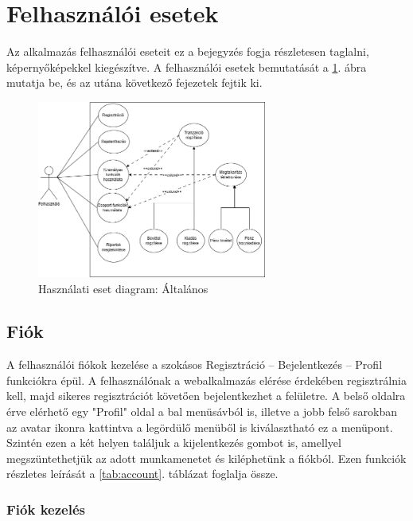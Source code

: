 \section{Felhasználói esetek}
Az alkalmazás felhasználói eseteit ez a bejegyzés fogja részletesen taglalni, képernyőképekkel kiegészítve. A felhasználói esetek bemutatását a \ref{fig:big-use-case}. ábra mutatja be, és az utána következő fejezetek fejtik ki.
\begin{figure}[H]
	\centering
	\includegraphics[height=220px]{img/big-use-case}
	\caption{Használati eset diagram: Általános}
	\label{fig:big-use-case}
\end{figure}

\subsection{Fiók}
A felhasználói fiókok kezelése a szokásos Regisztráció – Bejelentkezés – Profil funkciókra épül. A felhasználónak a webalkalmazás elérése érdekében regisztrálnia kell, majd sikeres regisztrációt követően bejelentkezhet a felületre. A belső oldalra érve elérhető egy "Profil" oldal a bal menüsávból is, illetve a jobb felső sarokban az avatar ikonra kattintva a legördülő menüből is kiválasztható ez a menüpont. Szintén ezen a két helyen találjuk a kijelentkezés gombot is, amellyel megszüntethetjük az adott munkamenetet és kiléphetünk a fiókból. Ezen funkciók részletes leírását a \ref{tab:account}. táblázat foglalja össze.
\subsubsection{Fiók kezelés}

